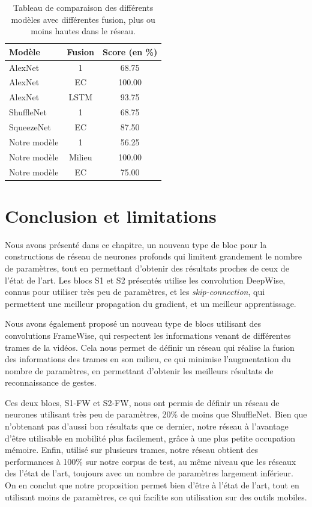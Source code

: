\begin{table}%
\centering
\begin{tabular}{|l|c|c|}

\hline
Modèle & Fusion & Score (en \%)\\
\hline
\hline
AlexNet & 1 & 68.75 \\
\hline
AlexNet & EC & 100.00\\
\hline
AlexNet & LSTM & 93.75\\
\hline
\hline
ShuffleNet & 1 & 68.75 \\
\hline
SqueezeNet & EC & 87.50 \\
\hline
\hline
Notre modèle & 1 & 56.25\\
\hline
Notre modèle & Milieu & 100.00\\
\hline
Notre modèle & EC & 75.00\\
\hline

\end{tabular}
\caption{Tableau de comparaison des différents modèles avec différentes fusion, plus ou moins hautes dans le réseau.}
\label{tab:fusion}
\end{table}


\section{Conclusion et limitations}

Nous avons présenté dans ce chapitre, un nouveau type de bloc pour la constructions de réseau de neurones profonds qui limitent grandement le nombre de paramètres, tout en permettant d'obtenir des résultats proches de ceux de l'état de l'art.
Les blocs S1 et S2 présentés utilise les convolution DeepWise, connus pour utiliser très peu de paramètres, et les \textit{skip-connection}, qui permettent une meilleur propagation du gradient, et un meilleur apprentissage.

Nous avons également proposé un nouveau type de blocs utilisant des convolutions FrameWise, qui respectent les informations venant de différentes trames de la vidéos.
Cela nous permet de définir un réseau qui réalise la fusion des informations des trames en son milieu, ce qui minimise l'augmentation du nombre de paramètres, en permettant d'obtenir les meilleurs résultats de reconnaissance de gestes.

Ces deux blocs, S1-FW et S2-FW, nous ont permis de définir un réseau de neurones utilisant très peu de paramètres, 20\% de moins que ShuffleNet.
Bien que n'obtenant pas d'aussi bon résultats que ce dernier, notre réseau à l'avantage d'être utilisable en mobilité plus facilement, grâce à une plus petite occupation mémoire.
Enfin, utilisé sur plusieurs trames, notre réseau obtient des performances à 100\% sur notre corpus de test, au même niveau que les réseaux des l'état de l'art, toujours avec un nombre de paramètres largement inférieur.
On en conclut que notre proposition permet bien d’être à l’état de l’art, tout en utilisant moins de paramètres, ce qui facilite son utilisation sur des outils mobiles.



